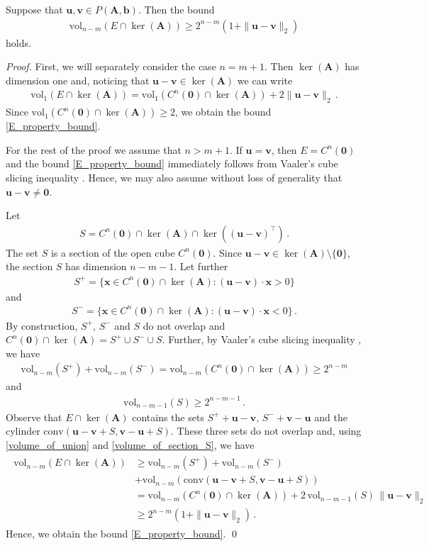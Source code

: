 \documentclass[runningheads]{llncs}
\newcommand{\ve}{\boldsymbol}
\newcommand{\be}{\begin{eqnarray}}
\newcommand{\bea}{\begin{eqnarray*}}
\newcommand{\ee}{\end{eqnarray}}
\newcommand{\eea}{\end{eqnarray*}}
\newcommand{\conv}{\mathrm{conv}}
\newcommand{\vol}{\mathrm{vol}}
\newcommand{\KP}{{P}}
\renewcommand\>{\rangle}
\newcommand\<{\langle}
\newcommand\0{\mathbf{0}}
\renewcommand\AA{\ve A}%
\begin{document}
\begin{lemma}
\label{E_property} Suppose that ${\ve u},{\ve v}\in \KP(\AA, {\ve b})$. Then the bound 
\be\label{E_property_bound} 
\vol_{n-m}(E\cap\ker(\AA))\ge 2^{n-m}(1+\|{\ve u}-{\ve v}\|_2)
\ee
holds.
\end{lemma}
\begin{proof}
First, we will separately consider the case $n=m+1$. Then $\ker(\AA)$ has dimension one
and, noticing that ${\ve u}-{\ve v}\in \ker(\AA)$ we can write
\bea
\vol_{1}(E\cap\ker(\AA))=\vol_{1}(C^n({\ve 0})\cap\ker(\AA))+2\|{\ve u}-{\ve v} \|_2\,.
\eea
Since $\vol_{1}(C^n({\ve 0})\cap\ker(\AA))\ge 2$, we obtain the bound \eqref{E_property_bound}.

For the rest of the proof we assume that $n>m+1$. 
If ${\ve u}={\ve v}$, then $E=C^n({\ve 0})$ and the bound \eqref{E_property_bound} immediately follows from Vaaler's cube slicing inequality \cite{Vaaler1979}. Hence, we may also assume without loss of generality that ${\ve u}-{\ve v}\neq {\ve 0}$.

Let
\bea
S=C^n({\ve 0})\cap \ker(\AA)\cap \ker(({\ve u}-{\ve v})^\top)\,.
\eea
The set $S$ is a section of the open cube $C^n({\ve 0})$. Since ${\ve u}-{\ve v}\in \ker(\AA)\setminus \{\ve 0\}$, the section $S$ has dimension  $n-m-1$.
Let further 
\bea
S^+=\{{\ve x}\in C^n({\ve 0})\cap \ker(\AA): ({\ve u}-{\ve v})\cdot{\ve x}>0\}
\eea
and 
\bea
S^-=\{{\ve x}\in C^n({\ve 0})\cap \ker(\AA): ({\ve u}-{\ve v})\cdot{\ve x}<0\}\,.
\eea
By construction, $S^+$, $S^-$ and $S$ do not overlap and $C^n({\ve 0})\cap \ker(\AA)=S^+\cup S^-\cup S$. Further, by Vaaler's cube slicing inequality \cite{Vaaler1979}, we have
\be\label{volume_of_union}
\vol_{n-m}(S^+)+\vol_{n-m}(S^-)=\vol_{n-m}(C^n({\ve 0})\cap \ker(\AA))\ge 2^{n-m}
\ee
and
\be\label{volume_of_section_S}
\vol_{n-m-1}(S)\ge 2^{n-m-1}\,.
\ee
Observe that $E\cap\ker(\AA)$ contains the sets $S^+ + {\ve u}-{\ve v}$,  $S^- + {\ve v}-{\ve u}$ and the cylinder
$\conv( {\ve u}-{\ve v} +S,   {\ve v}-{\ve u}+S)$. These three sets do not overlap and, using \eqref{volume_of_union} and \eqref{volume_of_section_S},
we have
\bea\begin{aligned}
\vol_{n-m}(E\cap\ker(\AA))& \ge \vol_{n-m}(S^+)+\vol_{n-m}(S^-)\\
&+ \vol_{n-m}(\conv( {\ve u}-{\ve v} +S,   {\ve v}-{\ve u}+S))\\
& =\vol_{n-m}(  C^n({\ve 0})\cap \ker(\AA)) + 2\,\vol_{n-m-1}(S)\,\|{\ve u}-{\ve v} \|_2\\
& \ge 2^{n-m}(1+\|{\ve u}-{\ve v} \|_2)\,.
\end{aligned}
\eea
Hence, we obtain the bound \eqref{E_property_bound}.
\qed

\end{proof}
\end{document}
